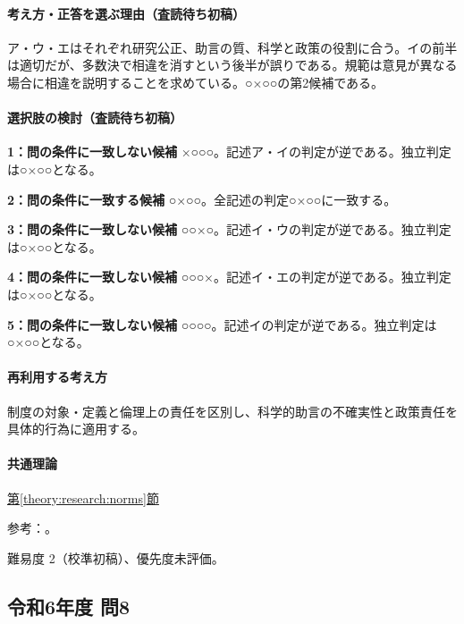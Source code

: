 \paragraph{考え方・正答を選ぶ理由（査読待ち初稿）} ア・ウ・エはそれぞれ研究公正、助言の質、科学と政策の役割に合う。イの前半は適切だが、多数決で相違を消すという後半が誤りである。規範は意見が異なる場合に相違を説明することを求めている。○×○○の第2候補である。

\paragraph{選択肢の検討（査読待ち初稿）}\mbox{}\par

\noindent\textbf{1：問の条件に一致しない候補} ×○○○。記述ア・イの判定が逆である。独立判定は○×○○となる。\par

\noindent\textbf{2：問の条件に一致する候補} ○×○○。全記述の判定○×○○に一致する。\par

\noindent\textbf{3：問の条件に一致しない候補} ○○×○。記述イ・ウの判定が逆である。独立判定は○×○○となる。\par

\noindent\textbf{4：問の条件に一致しない候補} ○○○×。記述イ・エの判定が逆である。独立判定は○×○○となる。\par

\noindent\textbf{5：問の条件に一致しない候補} ○○○○。記述イの判定が逆である。独立判定は○×○○となる。\par

\paragraph{再利用する考え方} 制度の対象・定義と倫理上の責任を区別し、科学的助言の不確実性と政策責任を具体的行為に適用する。

\paragraph{共通理論} \hyperref[theory:research:norms]{第\ref*{theory:research:norms}節}

\par 参考：\cite{scj_code2013}。

\par 難易度 2（校準初稿）、優先度未評価。

\subsection{令和6年度 問8}
\label{q:r06-reg-apt-08}

